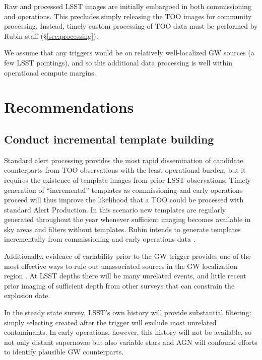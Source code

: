 \documentclass[DM,authoryear,toc]{lsstdoc}
\begin{document}
Raw and processed LSST images are initially embargoed in both commissioning and operations.
This precludes simply releasing the TOO images for community processing.
Instead, timely custom processing of TOO data must be performed by Rubin staff (\S \ref{sec:processing}).

We assume that any triggers would be on relatively well-localized GW sources (a few LSST pointings), and so this additional data processing is well within operational compute margins.

\section{Recommendations}

\subsection{Conduct incremental template building} \label{sec:templates}

Standard alert processing provides the most rapid dissemination of candidate counterparts from TOO observations with the least operational burden, but it requires the existence of template images from prior LSST observations.
Timely generation of ``incremental'' templates as commissioning and early operations proceed will thus improve the likelihood that a TOO could be processed with standard Alert Production.
In this scenario new templates are regularly generated throughout the year whenever sufficient imaging becomes available in sky areas and filters without templates.  
Rubin intends to generate templates incrementally from commissioning and early operations data .

Additionally, evidence of variability prior to the GW trigger provides one of the most effective ways to rule out unassociated sources in the GW localization region \citep[e.g.,][]{2019GCN.24223....1C, 2019GCN.26430....1S}.
At LSST depths there will be many unrelated events, and little recent prior imaging of sufficient depth from other surveys that can constrain the explosion date.

In the steady state survey, LSST's own history will provide substantial filtering: simply selecting \DIAObjects created after the trigger will exclude most unrelated contaminants.
In early operations, however, this history will not be available, so not only distant supernovae but also variable stars and AGN will confound efforts to identify plausible GW counterparts.
\end{document}
